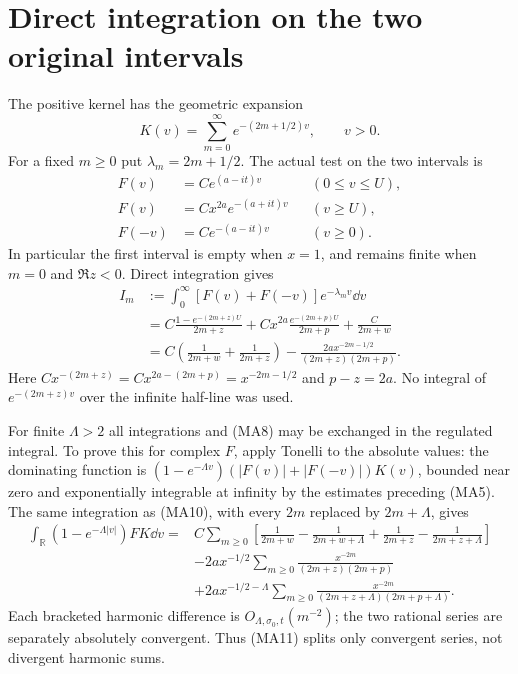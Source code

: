 \documentclass[11pt]{article}
\newcommand{\R}{\mathbb R}\newcommand{\C}{\mathbb C}
\begin{document}
\section{Direct integration on the two original intervals}
The positive kernel has the geometric expansion
\begin{equation}\tag{MA8}
 K(v)=\sum_{m=0}^\infty e^{-(2m+1/2)v},\qquad v>0.
\end{equation}
For a fixed $m\ge0$ put $\lambda_m=2m+1/2$. The actual test on the two
intervals is
\begin{equation}\tag{MA9}\begin{aligned}
 F(v)&=Ce^{(a-it)v}&& (0\le v\le U),\\
 F(v)&=Cx^{2a}e^{-(a+it)v}&& (v\ge U),\\
 F(-v)&=Ce^{-(a-it)v}&& (v\ge0).
\end{aligned}\end{equation}
In particular the first interval is empty when $x=1$, and remains finite
when $m=0$ and $\Re z<0$. Direct integration gives
\begin{equation}\tag{MA10}\begin{aligned}
 I_m&:=\int_0^\infty[F(v)+F(-v)]e^{-\lambda_m v}\dd v\\
 &=C\frac{1-e^{-(2m+z)U}}{2m+z}
   +Cx^{2a}\frac{e^{-(2m+p)U}}{2m+p}
   +\frac C{2m+w}\\
 &=C\left(\frac1{2m+w}+\frac1{2m+z}\right)
       -\frac{2a x^{-2m-1/2}}{(2m+z)(2m+p)}.
\end{aligned}\end{equation}
Here $Cx^{-(2m+z)}=Cx^{2a-(2m+p)}=x^{-2m-1/2}$ and $p-z=2a$.
No integral of $e^{-(2m+z)v}$ over the infinite half-line was used.

For finite $\Lambda>2$ all integrations and (MA8) may be exchanged in the
regulated integral. To prove this for complex $F$, apply Tonelli to the
absolute values: the dominating function is
$(1-e^{-\Lambda v})(|F(v)|+|F(-v)|)K(v)$, bounded near zero and
exponentially integrable at infinity by the estimates preceding (MA5).
The same integration as (MA10), with every $2m$ replaced by $2m+\Lambda$,
gives
\begin{equation}\tag{MA11}\begin{aligned}
 \int_\R(1-e^{-\Lambda|v|})FK\dd v
 ={}&C\sum_{m\ge0}\left[
 \frac1{2m+w}-\frac1{2m+w+\Lambda}
 +\frac1{2m+z}-\frac1{2m+z+\Lambda}\right]\\
 &-2a x^{-1/2}\sum_{m\ge0}
 \frac{x^{-2m}}{(2m+z)(2m+p)}\\
 &+2a x^{-1/2-\Lambda}\sum_{m\ge0}
 \frac{x^{-2m}}{(2m+z+\Lambda)(2m+p+\Lambda)}.
\end{aligned}\end{equation}
Each bracketed harmonic difference is $O_{\Lambda,\sigma_0,t}(m^{-2})$;
the two rational series are separately absolutely convergent. Thus (MA11)
splits only convergent series, not divergent harmonic sums.
\end{document}
